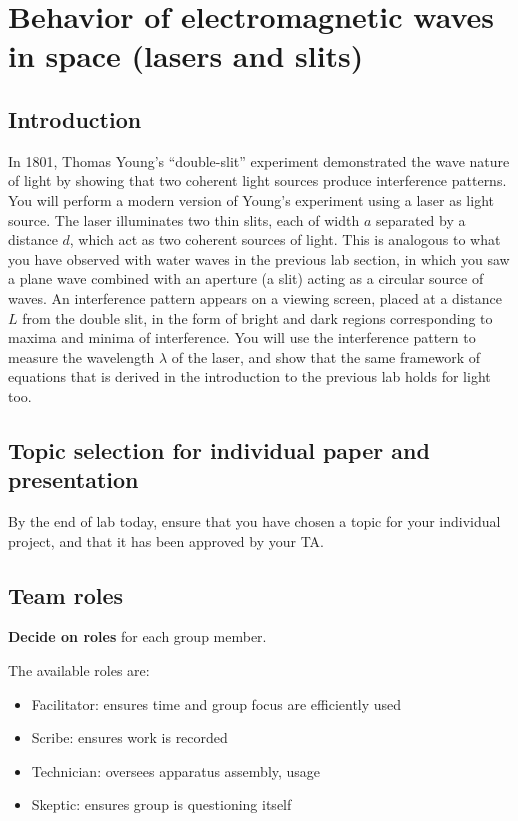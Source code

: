 \chapter{Behavior of electromagnetic waves in space (lasers and slits)}

\section{Introduction}

In 1801, Thomas Young's ``double-slit'' experiment demonstrated the wave nature of light by showing that two coherent light sources produce interference patterns. You will perform a modern version of Young's experiment using a
laser as light source. The laser illuminates two thin slits, each of width $a$ separated by a distance $d$, which act as two
coherent sources of light. This is analogous to what you have observed with water waves in the previous lab section, in
which you saw a plane wave combined with an aperture (a slit) acting as a circular source of waves. An interference
pattern appears on a viewing screen, placed at a distance $L$ from the double slit, in the form of bright and dark regions
corresponding to maxima and minima of interference. You will use the interference pattern to measure the wavelength
$\lambda$ of the laser, and show that the same framework of equations that is derived in the introduction to the previous lab
holds for light too.

\section{Topic selection for individual paper and presentation}

By the end of lab today, ensure that you have chosen a topic for your individual project, and that it has been approved by your TA.

\section{Team roles}

\begin{steps}
	\item \textbf{Decide on roles} for each group member.
\end{steps}

The available roles are:

\begin{itemize}
	\item Facilitator: ensures time and group focus are efficiently used
	\item Scribe: ensures work is recorded
	\item Technician: oversees apparatus assembly, usage
	\item Skeptic: ensures group is questioning itself
\end{itemize}

